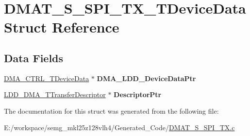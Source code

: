 \hypertarget{struct_d_m_a_t___s___s_p_i___t_x___t_device_data}{\section{D\-M\-A\-T\-\_\-\-S\-\_\-\-S\-P\-I\-\_\-\-T\-X\-\_\-\-T\-Device\-Data Struct Reference}
\label{struct_d_m_a_t___s___s_p_i___t_x___t_device_data}
}
\subsection*{Data Fields}
\begin{DoxyCompactItemize}
\item 
\hypertarget{struct_d_m_a_t___s___s_p_i___t_x___t_device_data_a6a9dd0c20382718335c7df43523f156c}{\hyperlink{struct_d_m_a___c_t_r_l___t_device_data}{D\-M\-A\-\_\-\-C\-T\-R\-L\-\_\-\-T\-Device\-Data} $\ast$ {\bfseries D\-M\-A\-\_\-\-L\-D\-D\-\_\-\-Device\-Data\-Ptr}}\label{struct_d_m_a_t___s___s_p_i___t_x___t_device_data_a6a9dd0c20382718335c7df43523f156c}

\item 
\hypertarget{struct_d_m_a_t___s___s_p_i___t_x___t_device_data_a2e4dae7b0d1c7191c20dfab14283b8f4}{\hyperlink{struct_l_d_d___d_m_a___t_transfer_descriptor}{L\-D\-D\-\_\-\-D\-M\-A\-\_\-\-T\-Transfer\-Descriptor} $\ast$ {\bfseries Descriptor\-Ptr}}\label{struct_d_m_a_t___s___s_p_i___t_x___t_device_data_a2e4dae7b0d1c7191c20dfab14283b8f4}

\end{DoxyCompactItemize}


The documentation for this struct was generated from the following file\-:\begin{DoxyCompactItemize}
\item 
E\-:/workspace/semg\-\_\-mkl25z128vlh4/\-Generated\-\_\-\-Code/\hyperlink{_d_m_a_t___s___s_p_i___t_x_8c}{D\-M\-A\-T\-\_\-\-S\-\_\-\-S\-P\-I\-\_\-\-T\-X.\-c}\end{DoxyCompactItemize}
